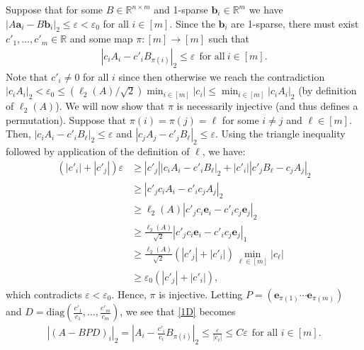 \documentclass[journal, onecolumn]{IEEEtran}
\begin{document}
Suppose that for some $B \in \mathbb{R}^{n \times m}$ and 1-sparse $\mathbf{b}_i \in \mathbb{R}^m$ we have  $|A\mathbf{a}_i - B\mathbf{b}_i|_2 \leq \varepsilon < \varepsilon_0$ for all $i \in [m]$. Since the $\mathbf{b}_i$ are 1-sparse, there must exist $c'_1, \ldots, c'_m \in \mathbb{R}$ and some map $\pi: [m] \to [m]$ such that 
\begin{align}\label{1D}
|c_iA_i - c'_iB_{\pi(i)}|_2 \leq \varepsilon \ \ \text{for all} \  i \in [m].
\end{align} 
Note that $c'_i \neq 0$ for all $i$ since then otherwise we reach the contradiction $|c_iA_i|_2 < \varepsilon_0 \leq (\ell_2(A)/\sqrt{2}) \min_{i \in [m]}|c_i| \leq \min_{i\in [m]}|c_iA_i|_2$ (by definition of $\ell_2(A)$). We will now show that $\pi$ is necessarily injective (and thus defines a permutation). Suppose that $\pi(i) = \pi(j) = \ell$ for some $i \neq j$ and $\ell \in [m]$. Then, $|c_iA_i - c'_iB_{\ell}|_2  \leq \varepsilon$ and $|c_jA_j - c'_jB_{\ell}|_2 \leq \varepsilon$. Using the triangle inequality followed by application of the definition of $\ell$, we have:
\begin{align*}
(|c'_i| + |c'_j|) \varepsilon
&\geq |c'_j||c_iA_i - c'_iB_{\ell}|_2 + |c'_i||c'_jB_{\ell} - c_jA_j|_2 \\
&\geq |c'_jc_iA_i - c'_ic_jA_j|_2 \\
&\geq \ell_2(A)|c'_jc_i\mathbf{e}_i - c'_ic_j\mathbf{e}_j|_2 \\
&\geq \frac{\ell_2(A)}{\sqrt{2}}|c'_jc_i\mathbf{e}_i - c'_ic_j\mathbf{e}_j|_1 \\
&\geq \frac{\ell_2(A)}{\sqrt{2}} \left( |c'_j| + |c'_i| \right) \min_{\ell \in [m]} |c_\ell | \\
&\geq \varepsilon_0 \left( |c'_j| + |c'_i| \right),
\end{align*}
%
which contradicts $\varepsilon < \varepsilon_0$. Hence, $\pi$ is injective. Letting $P = \left( \mathbf{e}_{\pi(1)} \cdots \mathbf{e}_{\pi(m)}\right)$ and $D = \text{diag}(\frac{c'_1}{c_1},\ldots,\frac{c'_m}{c_m})$, we see that \eqref{1D} becomes 
\begin{align}
|(A - BPD)_i|_2 = |A_i - \frac{c'_i}{c_i}B_{\pi(i)}|_2 \leq \frac{\varepsilon}{|c_i|} \leq C\varepsilon \ \ \text{for all } i \in [m].
\end{align}
\end{document}
